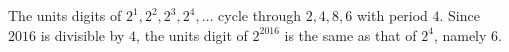 The units digits of $2^1,2^2,2^3,2^4,\dots$ cycle through $2,4,8,6$ with period $4$. Since $2016$ is divisible by $4$, the units digit of $2^{2016}$ is the same as that of $2^4$, namely $\boxed{6}$.
